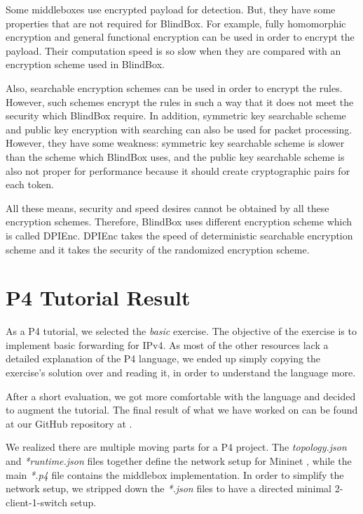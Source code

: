 \documentclass{winslabreport}
\begin{document}
Some middleboxes use encrypted payload for detection. But, they have some properties that are not required for BlindBox. For example,  fully homomorphic encryption\cite{24} and general functional encryption \cite{23} can be used in order to encrypt the payload. Their computation speed is so slow when they are compared with an encryption scheme used in BlindBox.

Also, searchable encryption schemes can be used in order to encrypt the rules. However, such schemes encrypt the rules in such a way that it does not meet the security which BlindBox require. In addition, symmetric key searchable scheme \cite{46} and public key encryption with searching  \cite{19} can also be used for packet processing. However, they have some weakness: symmetric key searchable scheme is slower than the scheme which BlindBox uses, and the public key searchable scheme is also not proper for performance because it should create cryptographic pairs for each token.

All these means, security and speed desires cannot be obtained by all these encryption schemes. Therefore, BlindBox uses different encryption scheme which is called DPIEnc. DPIEnc takes the speed of deterministic searchable encryption scheme and it takes the security of the randomized encryption scheme.   

\appendix

\section{P4 Tutorial Result}

As a P4 tutorial, we selected the \emph{basic} exercise. The objective of the exercise is to implement basic forwarding for IPv4. As most of the other resources lack a detailed explanation of the P4 language, we ended up simply copying the exercise's solution over and reading it, in order to understand the language more.

After a short evaluation, we got more comfortable with the language and decided to augment the tutorial. The final result of what we have worked on can be found at our GitHub repository at \cite{groupf}. 

We realized there are multiple moving parts for a P4 project. The \emph{topology.json} and \emph{*runtime.json} files together define the network setup for Mininet \cite{Lantz:2010:NLR:1868447.1868466}, while the main \emph{*.p4} file contains the middlebox implementation. In order to simplify the network setup, we stripped down the \emph{*.json} files to have a directed minimal 2-client-1-switch setup.
\end{document}
